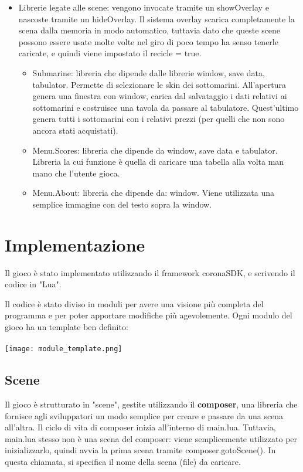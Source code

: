 \documentclass[12pt]{article}
\begin{document}
\begin{itemize}
    \item Librerie legate alle scene: vengono invocate tramite un showOverlay e nascoste tramite un hideOverlay. Il sistema overlay scarica completamente la scena dalla memoria in modo automatico, tuttavia dato che queste scene possono essere usate molte volte nel giro di poco tempo ha senso tenerle caricate, e quindi viene impostato il recicle = true.
        \begin{itemize}
            \item Submarine: libreria che dipende dalle librerie window, save data, tabulator. Permette di selezionare le skin dei sottomarini. All’apertura genera una finestra con window, carica dal salvataggio i dati relativi ai sottomarini e costruisce una tavola da passare al tabulatore. Quest'ultimo genera tutti i sottomarini con i relativi prezzi (per quelli che non sono ancora stati acquistati). 
            \item Menu.Scores: libreria che dipende da window, save data e tabulator. Libreria la cui funzione è quella di caricare una tabella alla volta man mano che l'utente gioca. 
            \item Menu.About:  libreria che dipende da: window. Viene utilizzata una semplice immagine con del testo sopra la window. 
        \end{itemize}
    
\end{itemize}
\section{Implementazione}
Il gioco è stato implementato utilizzando il framework coronaSDK, e scrivendo il codice in "Lua". 


Il codice è stato diviso in moduli per avere una visione più completa del programma e per poter apportare modifiche più agevolemente. 
Ogni modulo del gioco ha un template ben definito:
\\\\


\texttt{[image: module\_template.png]}\\


\subsection{Scene}
Il gioco è strutturato in "scene", gestite utilizzando il \textbf{composer}, una libreria che fornisce agli sviluppatori  un modo semplice per creare e passare da una scena all'altra. Il ciclo di vita di composer inizia all'interno di main.lua. Tuttavia, main.lua stesso non è una scena del composer: viene semplicemente utilizzato per inizializzarlo, quindi avvia la prima scena tramite composer.gotoScene(). In questa chiamata, si specifica il nome della scena (file) da caricare. 
\end{document}
